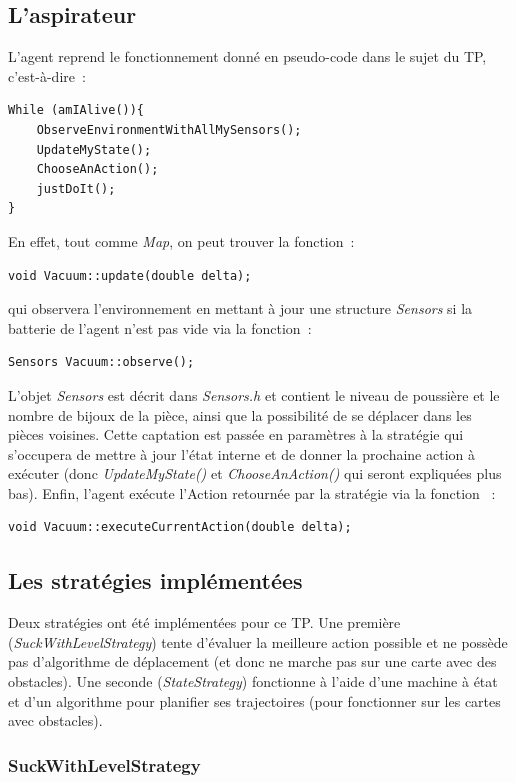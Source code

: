 \documentclass{article}
\begin{document}
\subsection{L'aspirateur}
L'agent reprend le fonctionnement donné en pseudo-code dans le sujet du TP, c'est-à-dire~:
\begin{verbatim}
While (amIAlive()){
    ObserveEnvironmentWithAllMySensors();
    UpdateMyState();
    ChooseAnAction();
    justDoIt();
}
\end{verbatim}
En effet, tout comme \emph{Map}, on peut trouver la fonction~:
\begin{verbatim}
void Vacuum::update(double delta);
\end{verbatim}
qui observera l'environnement en mettant à jour une structure \emph{Sensors} si la batterie de l'agent n'est pas vide via la fonction~:
\begin{verbatim}
Sensors Vacuum::observe();
\end{verbatim}
L'objet \emph{Sensors} est décrit dans \emph{Sensors.h} et contient le niveau de poussière et le nombre de bijoux de la pièce, ainsi que la possibilité de se déplacer dans les pièces voisines. Cette captation est passée en paramètres à la stratégie qui s'occupera de mettre à jour l'état interne et de donner la prochaine action à exécuter (donc \emph{UpdateMyState()} et \emph{ChooseAnAction()} qui seront expliquées plus bas). Enfin, l'agent exécute l'Action retournée par la stratégie via la fonction ~:
\begin{verbatim}
void Vacuum::executeCurrentAction(double delta);
\end{verbatim}
\subsection{Les stratégies implémentées}

Deux stratégies ont été implémentées pour ce TP. Une première (\emph{SuckWithLevelStrategy}) tente d'évaluer la meilleure action possible et ne possède pas d'algorithme de déplacement (et donc ne marche pas sur une carte avec des obstacles). Une seconde (\emph{StateStrategy}) fonctionne à l'aide d'une machine à état et d'un algorithme pour planifier ses trajectoires (pour fonctionner sur les cartes avec obstacles).

\subsubsection{SuckWithLevelStrategy}
\end{document}
